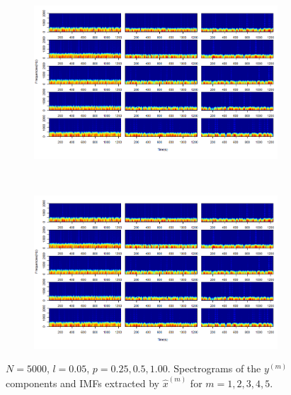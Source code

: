 \documentclass[11pt, a4paper]{article} %
\begin{document}
\begin{figure}
\begin{subfigure}{1.1\textwidth}
  \centering
  \includegraphics[width=\linewidth]{spectro_N5000_l005_y_m_1_5.png}
  \label{fig:sfig1}
\end{subfigure}\\
\begin{subfigure}{1.1\textwidth}
  \centering
  \includegraphics[width=\linewidth]{spectro_N5000_l005_IMF_m_1_5.png}
  \label{fig:sfig2}
\end{subfigure}
\label{fig1}
\caption{$N = 5000$, $l = 0.05$, $p = 0.25, 0.5, 1.00$. Spectrograms of the $y^{(m)}$ components and IMFs extracted by $\hat{x}^{(m)}$ for $m = 1,2,3,4,5$.}
\end{figure}

\restoregeometry


\end{document}
